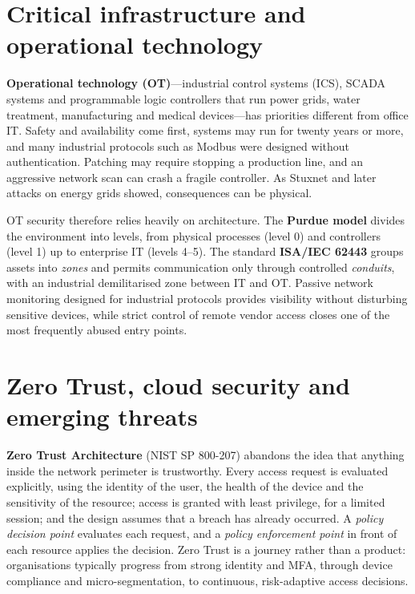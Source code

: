 \section{Critical infrastructure and operational technology}\label{sec:13.6}
\textbf{Operational technology (OT)}—industrial control systems (ICS), SCADA systems and programmable logic controllers that run power grids, water treatment, manufacturing and medical devices—has priorities different from office IT. Safety and availability come first, systems may run for twenty years or more, and many industrial protocols such as Modbus were designed without authentication. Patching may require stopping a production line, and an aggressive network scan can crash a fragile controller. As Stuxnet and later attacks on energy grids showed, consequences can be physical.

OT security therefore relies heavily on architecture. The \textbf{Purdue model} divides the environment into levels, from physical processes (level 0) and controllers (level 1) up to enterprise IT (levels 4–5). The standard \textbf{ISA/IEC 62443} groups assets into \emph{zones} and permits communication only through controlled \emph{conduits}, with an industrial demilitarised zone between IT and OT. Passive network monitoring designed for industrial protocols provides visibility without disturbing sensitive devices, while strict control of remote vendor access closes one of the most frequently abused entry points.

\section{Zero Trust, cloud security and emerging threats}\label{sec:13.7}
\textbf{Zero Trust Architecture} (NIST SP 800-207) abandons the idea that anything inside the network perimeter is trustworthy. Every access request is evaluated explicitly, using the identity of the user, the health of the device and the sensitivity of the resource; access is granted with least privilege, for a limited session; and the design assumes that a breach has already occurred. A \emph{policy decision point} evaluates each request, and a \emph{policy enforcement point} in front of each resource applies the decision. Zero Trust is a journey rather than a product: organisations typically progress from strong identity and MFA, through device compliance and micro-segmentation, to continuous, risk-adaptive access decisions.

